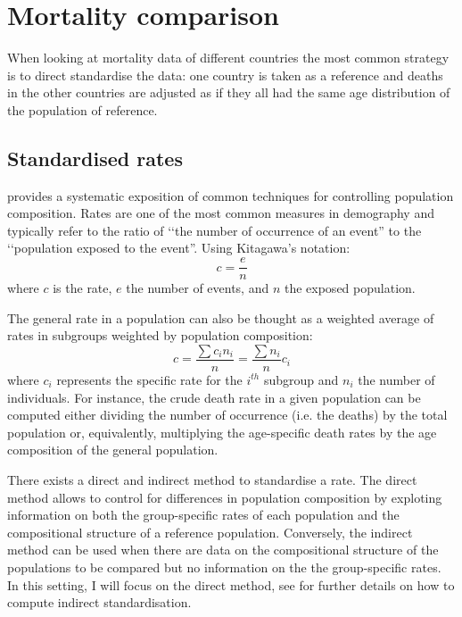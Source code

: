 \documentclass[\main/main.tex]{subfiles}
\begin{document}
\section{Mortality comparison}
When looking at mortality data of different countries the most common strategy is to direct standardise the data: one country is taken as a reference and deaths in the other countries are adjusted as if they all had the same age distribution of the population of reference.

\subsection{Standardised rates}
\cite{Kitagawa1964} provides a systematic exposition of common techniques for controlling population composition. Rates are one of the most common measures in demography and typically refer to the ratio of \lq\lq the number of occurrence of an event'' to the \lq\lq population exposed to the event''. Using Kitagawa's notation:
\begin{equation}
    c = \frac{e}{n}
\end{equation}
where $c$ is the rate, $e$ the number of events, and $n$ the exposed population.

The general rate in a  population can also be thought as a weighted average of rates in subgroups weighted by population composition:
\begin{equation}
    c = \frac{\sum  c_i n_i}{n} = \frac{\sum n_i}{n} c_i
\end{equation}
where $c_i$ represents the specific rate for the $i^{th}$ subgroup and $n_i$ the number of individuals. For instance, the crude death rate in a given population can be computed either dividing the number of occurrence (i.e. the deaths) by the total population or, equivalently, multiplying the age-specific death rates by the age composition of the general population. 

There exists a direct and indirect method to standardise a rate.
The direct method allows to control for differences in population composition by exploting information on both the group-specific rates of each population and the compositional structure of a reference population. Conversely, the indirect method can be used when there are data on the compositional structure of the populations to be compared but no 
information on the the group-specific rates. In this setting, I will focus on the direct method, see \cite{Kitagawa1964} for further details on how to compute indirect standardisation.
\end{document}

